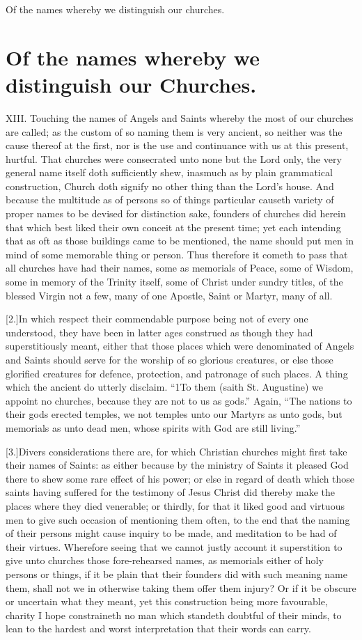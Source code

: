 Of the names whereby we distinguish our churches.
\section*{Of the names whereby we distinguish our Churches.}
XIII. Touching the names of Angels and Saints whereby the most of our churches are called; as the custom of so naming them is very ancient, so neither was the cause thereof at the first, nor is the use and continuance with us at this present, hurtful. That churches were consecrated unto none but the Lord only, the very general name itself doth sufficiently shew, inasmuch as by plain grammatical construction, Church doth signify no other thing than the Lord’s house. And because the multitude as of persons so of things particular causeth variety of proper names to be devised for distinction sake, founders of churches did herein that which best liked their own conceit at the present time; yet each intending that as oft as those buildings came to be mentioned, the name should put men in mind of some memorable thing or person. Thus therefore it cometh to pass that all churches have had their names, some as memorials of Peace, some of Wisdom, some in memory of the Trinity itself, some of Christ under sundry titles, of the blessed Virgin not a few, many of one Apostle, Saint or Martyr, many of all.

[2.]In which respect their commendable purpose being not of every one understood, they have been in latter ages construed as though they had superstitiously meant, either that those places which were denominated of Angels and Saints should serve for the worship of so glorious creatures, or else those glorified creatures for defence, protection, and  patronage of such places. A thing which the ancient do utterly disclaim.
 “1To them (saith St. Augustine) we appoint no churches, because they are not to us as gods.” Again, “The nations to their gods erected temples, we not temples unto our Martyrs as unto gods, but memorials as unto dead men, whose spirits with God are still living.”

[3.]Divers considerations there are, for which Christian churches might first take their names of Saints: as either because by the ministry of Saints it pleased God there to shew some rare effect of his power; or else in regard of death which those saints having suffered for the testimony of Jesus Christ did thereby make the places where they died venerable; or thirdly, for that it liked good and virtuous men to give such occasion of mentioning them often, to the end that the naming of their persons might cause inquiry to be made, and meditation to be had of their virtues. Wherefore seeing that we cannot justly account it superstition to give unto churches those fore-rehearsed names, as memorials either of holy persons or things, if it be plain that their founders did with such meaning name them, shall not we in otherwise taking them offer them injury? Or if it be obscure or uncertain what they meant, yet this construction being more  favourable, charity I hope constraineth no man which standeth doubtful of their minds, to lean to the hardest and worst interpretation that their words can carry.

